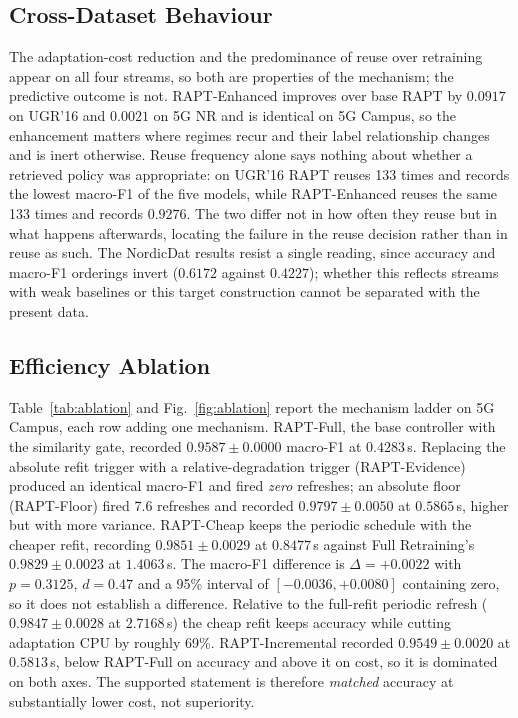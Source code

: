 \documentclass[conference]{IEEEtran}
\begin{document}
\subsection{Cross-Dataset Behaviour}
The adaptation-cost reduction and the predominance of reuse over retraining appear
on all four streams, so both are properties of the mechanism; the predictive outcome
is not. RAPT-Enhanced improves over base RAPT by $0.0917$ on UGR'16 and $0.0021$ on
5G NR and is identical on 5G Campus, so the enhancement matters where regimes recur
and their label relationship changes and is inert otherwise. Reuse frequency alone
says nothing about whether a retrieved policy was appropriate: on UGR'16 RAPT reuses
133 times and records the lowest macro-F1 of the five models, while RAPT-Enhanced
reuses the same 133 times and records $0.9276$. The two differ not in how often they
reuse but in what happens afterwards, locating the failure in the reuse decision
rather than in reuse as such. The NordicDat results resist a single reading, since
accuracy and macro-F1 orderings invert ($0.6172$ against $0.4227$); whether this
reflects streams with weak baselines or this target construction cannot be separated
with the present data.

\subsection{Efficiency Ablation}
\label{sec:ablation}
Table~\ref{tab:ablation} and Fig.~\ref{fig:ablation} report the mechanism ladder on
5G Campus, each row adding one mechanism. RAPT-Full, the base controller with the similarity gate, recorded
$0.9587 \pm 0.0000$ macro-F1 at $0.4283$\,s. Replacing the absolute refit trigger
with a relative-degradation trigger (RAPT-Evidence) produced an identical macro-F1 and
fired \emph{zero} refreshes; an absolute floor (RAPT-Floor) fired 7.6 refreshes and
recorded $0.9797 \pm 0.0050$ at $0.5865$\,s, higher but with more variance.
RAPT-Cheap keeps the periodic schedule with the cheaper refit, recording
$0.9851 \pm 0.0029$ at $0.8477$\,s against Full Retraining's $0.9829 \pm 0.0023$ at
$1.4063$\,s. The macro-F1 difference is $\Delta = +0.0022$ with $p = 0.3125$,
$d = 0.47$ and a 95\% interval of $[-0.0036, +0.0080]$ containing zero, so it does
not establish a difference. Relative to the full-refit periodic refresh
($0.9847 \pm 0.0028$ at $2.7168$\,s) the cheap refit keeps accuracy while cutting
adaptation CPU by roughly 69\%. RAPT-Incremental recorded $0.9549 \pm 0.0020$ at
$0.5813$\,s, below RAPT-Full on accuracy and above it on cost, so it is dominated on
both axes. The supported statement is therefore \emph{matched} accuracy at
substantially lower cost, not superiority.
\end{document}
